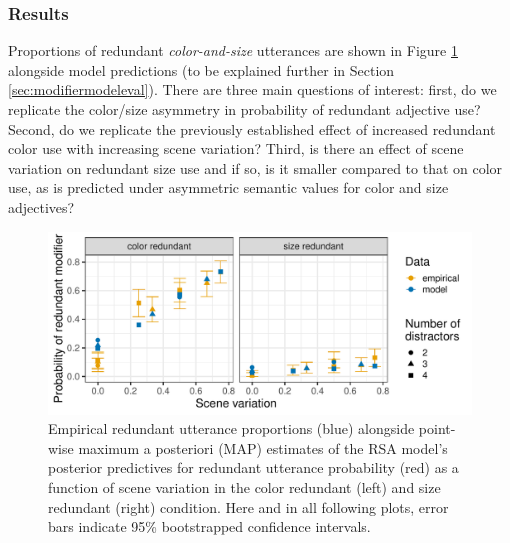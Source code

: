 \documentclass[11pt]{article}
\newcommand{\figref}[1]{Figure \ref{#1}}
\newcommand{\sectionref}[1]{Section \ref{#1}}
\begin{document}
\subsubsection{Results}
\label{sec:modelempiricalresults}

Proportions of redundant \emph{color-and-size} utterances are shown in \figref{fig:exp1results} alongside model predictions (to be explained further in \sectionref{sec:modifiermodeleval}). There are three main questions of interest: first, do we replicate the color/size asymmetry in probability of redundant adjective use? Second, do we replicate the previously established effect of increased redundant color use with increasing scene variation? Third, is there an effect of scene variation on redundant size use and if so, is it smaller compared to that on color use, as is predicted under asymmetric semantic values for color and size adjectives?

\begin{figure}
\centering
\includegraphics[width=.8\textwidth]{pics/exp1-empirical-predictives}
\caption{Empirical redundant utterance proportions  (blue)  alongside point-wise maximum a posteriori (MAP) estimates of the RSA model's posterior predictives for redundant utterance probability (red) as a function of scene variation in the color redundant (left) and size redundant (right) condition. Here and in all following plots, error bars indicate 95\% bootstrapped confidence intervals.}
\label{fig:exp1results}
\end{figure}
\end{document}
